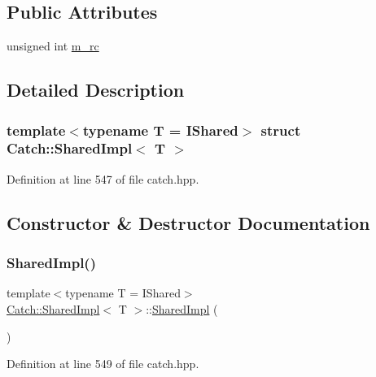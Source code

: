 \subsection*{Public Attributes}
\begin{DoxyCompactItemize}
\item 
unsigned int \hyperlink{struct_catch_1_1_shared_impl_a7e71ef1985b85aa41a1632f932a96bcb}{m\+\_\+rc}
\end{DoxyCompactItemize}


\subsection{Detailed Description}
\subsubsection*{template$<$typename T = I\+Shared$>$\newline
struct Catch\+::\+Shared\+Impl$<$ T $>$}



Definition at line 547 of file catch.\+hpp.



\subsection{Constructor \& Destructor Documentation}
\hypertarget{struct_catch_1_1_shared_impl_a0629856ee353298b61ad52cf60e716fb}{}\label{struct_catch_1_1_shared_impl_a0629856ee353298b61ad52cf60e716fb} 
\subsubsection{\texorpdfstring{Shared\+Impl()}{SharedImpl()}}
{\footnotesize\ttfamily template$<$typename T = I\+Shared$>$ \\
\hyperlink{struct_catch_1_1_shared_impl}{Catch\+::\+Shared\+Impl}$<$ T $>$\+::\hyperlink{struct_catch_1_1_shared_impl}{Shared\+Impl} (\begin{DoxyParamCaption}{ }\end{DoxyParamCaption})\hspace{0.3cm}{\ttfamily [inline]}}



Definition at line 549 of file catch.\+hpp.



